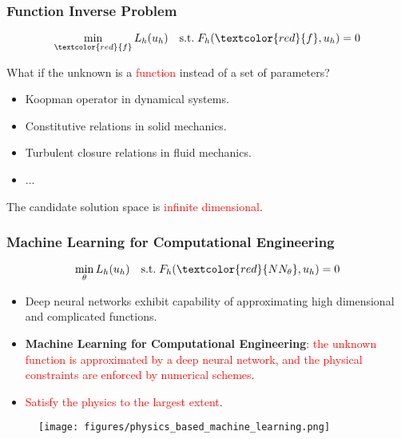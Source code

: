 \documentclass[usenames,dvipsnames]{beamer}
\begin{document}
\begin{frame}
	\frametitle{Function Inverse Problem}
	
	\begin{equation*}
		\min_{\textcolor{red}{f}} L_h(u_h) \quad \mathrm{s.t.}\; F_h(\textcolor{red}{f}, u_h) = 0
	\end{equation*}
	
	What if the unknown is a \textcolor{red}{function} instead of a set of parameters?
\begin{itemize}
	\item Koopman operator in dynamical systems.
	\item Constitutive relations in solid mechanics. 
	\item Turbulent closure relations in fluid mechanics.
	\item ...
\end{itemize}

The candidate solution space is \textcolor{red}{infinite dimensional}.

\end{frame}

\begin{frame}
	\frametitle{Machine Learning for Computational Engineering}
	$$\min_{\theta} L_h(u_h) \quad \mathrm{s.t.}\;F_h(\textcolor{red}{NN_\theta}, u_h) = 0$$
	\vspace{-0.5cm}
	\begin{itemize}
		\item Deep neural networks exhibit capability of approximating high dimensional and complicated functions. 
		\item \textbf{Machine Learning for Computational Engineering}: \textcolor{red}{the unknown function is approximated by a deep neural network, and the physical constraints are enforced by numerical schemes}.
		\item \textcolor{red}{Satisfy the physics to the largest extent}.
	\end{itemize}
	\begin{figure}[hbt]
  \texttt{[image: figures/physics\_based\_machine\_learning.png]}
\end{figure}
\end{frame}
\end{document}
